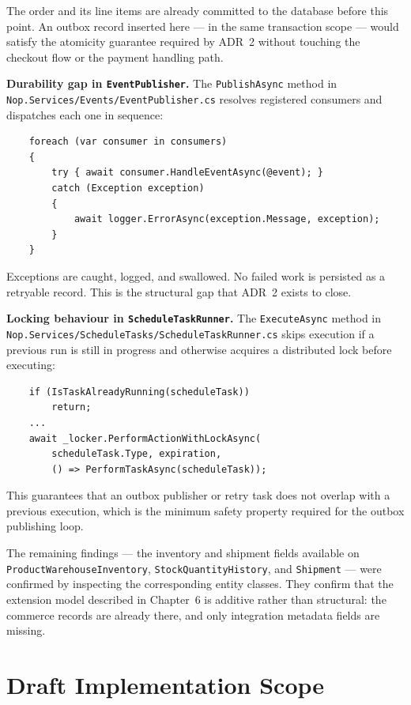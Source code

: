 The order and its line items are already committed to the database before this point. An outbox
record inserted here --- in the same transaction scope --- would satisfy the atomicity guarantee
required by ADR~2 without touching the checkout flow or the payment handling path.

\textbf{Durability gap in \texttt{EventPublisher}.}
The \texttt{PublishAsync} method in \texttt{Nop.Services/Events/EventPublisher.cs} resolves
registered consumers and dispatches each one in sequence:

\begin{verbatim}
    foreach (var consumer in consumers)
    {
        try { await consumer.HandleEventAsync(@event); }
        catch (Exception exception)
        {
            await logger.ErrorAsync(exception.Message, exception);
        }
    }
\end{verbatim}

Exceptions are caught, logged, and swallowed. No failed work is persisted as a retryable
record. This is the structural gap that ADR~2 exists to close.

\textbf{Locking behaviour in \texttt{ScheduleTaskRunner}.}
The \texttt{ExecuteAsync} method in \texttt{Nop.Services/ScheduleTasks/ScheduleTaskRunner.cs}
skips execution if a previous run is still in progress and otherwise acquires a distributed
lock before executing:

\begin{verbatim}
    if (IsTaskAlreadyRunning(scheduleTask))
        return;
    ...
    await _locker.PerformActionWithLockAsync(
        scheduleTask.Type, expiration,
        () => PerformTaskAsync(scheduleTask));
\end{verbatim}

This guarantees that an outbox publisher or retry task does not overlap with a previous
execution, which is the minimum safety property required for the outbox publishing loop.

The remaining findings --- the inventory and shipment fields available on
\texttt{ProductWarehouseInventory}, \texttt{StockQuantityHistory}, and \texttt{Shipment} ---
were confirmed by inspecting the corresponding entity classes. They confirm that the extension
model described in Chapter~6 is additive rather than structural: the commerce records are
already there, and only integration metadata fields are missing.
\section{Draft Implementation Scope}

